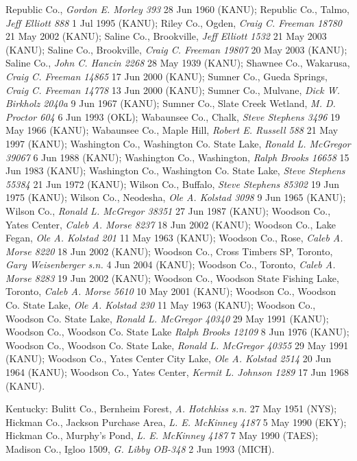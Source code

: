 \documentclass{article}
\begin{document}
Republic Co., \textit{Gordon E. Morley 393} 28 Jun 1960 (KANU); 
Republic Co., Talmo, \textit{Jeff Elliott 888} 1 Jul 1995 (KANU); 
Riley Co., Ogden, \textit{Craig C. Freeman 18780} 21 May 2002 (KANU); 
Saline Co., Brookville, \textit{Jeff Elliott 1532} 21 May 2003 (KANU); 
Saline Co., Brookville, \textit{Craig C. Freeman 19807} 20 May 2003 (KANU); 
Saline Co., \textit{John C. Hancin 2268} 28 May 1939 (KANU); 
Shawnee Co., Wakarusa, \textit{Craig C. Freeman 14865} 17 Jun 2000 (KANU); 
Sumner Co., Gueda Springs, \textit{Craig C. Freeman 14778} 13 Jun 2000 (KANU); 
Sumner Co., Mulvane, \textit{Dick W. Birkholz 2040a} 9 Jun 1967 (KANU); 
Sumner Co., Slate Creek Wetland, \textit{M. D. Proctor 604} 6 Jun 1993 (OKL); 
Wabaunsee Co., Chalk, \textit{Steve Stephens 3496} 19 May 1966 (KANU); 
Wabaunsee Co., Maple Hill, \textit{Robert E. Russell 588} 21 May 1997 (KANU); 
Washington Co., Washington Co. State Lake, \textit{Ronald L. McGregor 39067} 6 Jun 1988 (KANU); 
Washington Co., Washington, \textit{Ralph Brooks 16658} 15 Jun 1983 (KANU); 
Washington Co., Washington Co. State Lake, \textit{Steve Stephens 55384} 21 Jun 1972 (KANU); 
Wilson Co., Buffalo, \textit{Steve Stephens 85302} 19 Jun 1975 (KANU); 
Wilson Co., Neodesha, \textit{Ole A. Kolstad 3098} 9 Jun 1965 (KANU); 
Wilson Co., \textit{Ronald L. McGregor 38351} 27 Jun 1987 (KANU); 
Woodson Co., Yates Center, \textit{Caleb A. Morse 8237} 18 Jun 2002 (KANU); 
Woodson Co., Lake Fegan, \textit{Ole A. Kolstad 201} 11 May 1963 (KANU); 
Woodson Co., Rose, \textit{Caleb A. Morse 8220} 18 Jun 2002 (KANU); 
Woodson Co., Cross Timbers SP, Toronto, \textit{Gary Weisenberger s.n.} 4 Jun 2004 (KANU); 
Woodson Co., Toronto, \textit{Caleb A. Morse 8283} 19 Jun 2002 (KANU); 
Woodson Co., Woodson State Fishing Lake, Toronto, \textit{Caleb A. Morse 5610} 10 May 2001 (KANU); 
Woodson Co., Woodson Co. State Lake, \textit{Ole A. Kolstad 230} 11 May 1963 (KANU); 
Woodson Co., Woodson Co. State Lake, \textit{Ronald L. McGregor 40340} 29 May 1991 (KANU); 
Woodson Co., Woodson Co. State Lake \textit{Ralph Brooks 12109} 8 Jun 1976 (KANU); 
Woodson Co., Woodson Co. State Lake, \textit{Ronald L. McGregor 40355} 29 May 1991 (KANU); 
Woodson Co., Yates Center City Lake, \textit{Ole A. Kolstad 2514} 20 Jun 1964 (KANU); 
Woodson Co., Yates Center, \textit{Kermit L. Johnson 1289} 17 Jun 1968 (KANU). 

Kentucky:
Bulitt Co., Bernheim Forest, \textit{A. Hotchkiss s.n.} 27 May 1951 (NYS); 
Hickman Co., Jackson Purchase Area, \textit{L. E. McKinney 4187} 5 May 1990 (EKY); 
Hickman Co., Murphy's Pond, \textit{L. E. McKinney 4187} 7 May 1990 (TAES); 
Madison Co., Igloo 1509, \textit{G. Libby OB-348} 2 Jun 1993 (MICH). 
\end{document}
